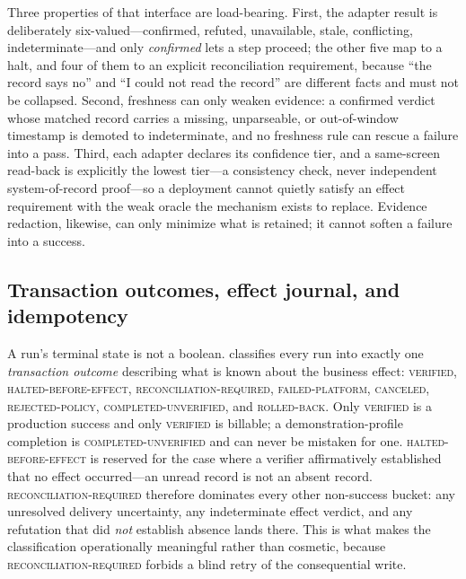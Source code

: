 Three properties of that interface are load-bearing. First, the adapter result
is deliberately six-valued---confirmed, refuted, unavailable, stale,
conflicting, indeterminate---and only \emph{confirmed} lets a step proceed;
the other five map to a halt, and four of them to an explicit reconciliation
requirement, because ``the record says no'' and ``I could not read the record''
are different facts and must not be collapsed. Second, freshness can only
weaken evidence: a confirmed verdict whose matched record carries a missing,
unparseable, or out-of-window timestamp is demoted to indeterminate, and no
freshness rule can rescue a failure into a pass. Third, each adapter declares
its confidence tier, and a same-screen read-back is explicitly the lowest
tier---a consistency check, never independent system-of-record proof---so a
deployment cannot quietly satisfy an effect requirement with the weak oracle
the mechanism exists to replace. Evidence redaction, likewise, can only
minimize what is retained; it cannot soften a failure into a success.

\subsection{Transaction outcomes, effect journal, and idempotency}
A run's terminal state is not a boolean. \system{} classifies every run into
exactly one \emph{transaction outcome} describing what is known about the
business effect: \textsc{verified}, \textsc{halted-before-effect},
\textsc{reconciliation-required}, \textsc{failed-platform}, \textsc{canceled},
\textsc{rejected-policy}, \textsc{completed-unverified}, and
\textsc{rolled-back}. Only \textsc{verified} is a production success and only
\textsc{verified} is billable; a demonstration-profile completion is
\textsc{completed-unverified} and can never be mistaken for one.
\textsc{halted-before-effect} is reserved for the case where a verifier
affirmatively established that no effect occurred---an unread record is not an
absent record. \textsc{reconciliation-required} therefore dominates every other
non-success bucket: any unresolved delivery uncertainty, any indeterminate
effect verdict, and any refutation that did \emph{not} establish absence lands
there. This is what makes the classification operationally meaningful rather
than cosmetic, because \textsc{reconciliation-required} forbids a blind retry of
the consequential write.

